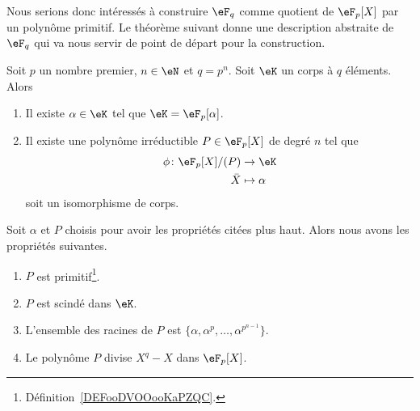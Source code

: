 Nous serions donc intéressés à construire \( \eF_{q}\) comme quotient de \( \eF_p[X]\) par un polynôme primitif. Le théorème suivant donne une description abstraite de \( \eF_q\) qui va nous servir de point de départ pour la construction.
\begin{theorem}    \label{ThoqSludu}
	Soit \( p\) un nombre premier, \( n\in \eN\) et \( q=p^n\). Soit \( \eK\) un corps à \( q\) éléments. Alors
	\begin{enumerate}
		\item
		      Il existe \( \alpha\in \eK\) tel que \( \eK=\eF_p[\alpha]\).
		\item
		      Il existe une polynôme irréductible \( P\in\eF_p[X]\) de degré \( n\) tel que
		      \begin{equation}        \label{EqWlMhhm}
			      \begin{aligned}
				      \phi\colon \eF_p[X]/(P) & \to \eK        \\
				      \bar X                  & \mapsto \alpha
			      \end{aligned}
		      \end{equation}
		      soit un isomorphisme de corps.
	\end{enumerate}
	Soit \( \alpha\) et \( P\) choisis pour avoir les propriétés citées plus haut. Alors nous avons les propriétés suivantes.
	\begin{enumerate}
		\item
		      \( P\) est primitif\footnote{Définition~\ref{DEFooDVOOooKaPZQC}.}.
		\item
		      \( P\) est scindé dans \( \eK\).
		\item
		      L'ensemble des racines de \( P\) est \( \{ \alpha,\alpha^p,\ldots, \alpha^{p^{n-1}} \}\).
		\item
		      Le polynôme \( P\) divise \( X^q-X\) dans \( \eF_p[X]\).
	\end{enumerate}
\end{theorem}

